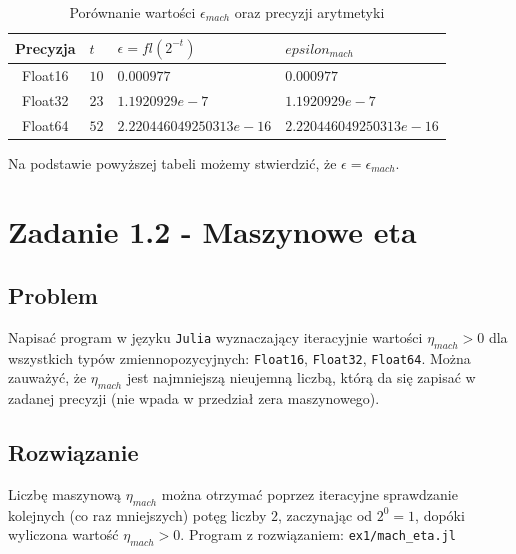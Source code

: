 \documentclass[12pt]{article}
\begin{document}
        \begin{table}[h!]
            \centering
            \begin{tabularx}{0.78\textwidth}{c l l l}
                \hline
                Precyzja & $t$ & $\epsilon = fl(2^{-t})$ & $epsilon_{mach}$ \\
                \hline
                Float16 & $10$ & $0.000977$ & $0.000977$ \\
                Float32 & $23$ & $1.1920929e-7$ & $1.1920929e-7$ \\
                Float64 & $52$ & $2.220446049250313e-16$ & $2.220446049250313e-16$ \\
                \hline
            \end{tabularx}
            \caption{Porównanie wartości $\epsilon_{mach}$ oraz precyzji arytmetyki}
            \label{table:eps_macheps}
        \end{table}

        \noindent Na podstawie powyższej tabeli możemy stwierdzić, że $\epsilon = \epsilon_{mach}$.

\newpage

\section*{Zadanie 1.2 - Maszynowe eta}
    \subsection*{Problem}
    Napisać program w języku \texttt{Julia} wyznaczający iteracyjnie wartości
    $\eta_{mach} > 0$ dla wszystkich typów zmiennopozycyjnych: \texttt{Float16}, \texttt{Float32}, \texttt{Float64}.
    \newline
    Można zauważyć, że $\eta_{mach}$ jest najmniejszą nieujemną liczbą,
    którą da się zapisać w zadanej precyzji (nie wpada w przedział zera maszynowego).
    \newline

    \subsection*{Rozwiązanie}
        Liczbę maszynową $\eta_{mach}$ można otrzymać poprzez iteracyjne sprawdzanie kolejnych
        (co raz mniejszych) potęg liczby $2$, zaczynając od $2^0 = 1$,
        dopóki wyliczona wartość $\eta_{mach} > 0$.
        \newline\newline
        Program z rozwiązaniem: \texttt{ex1/mach\_eta.jl}
\end{document}

